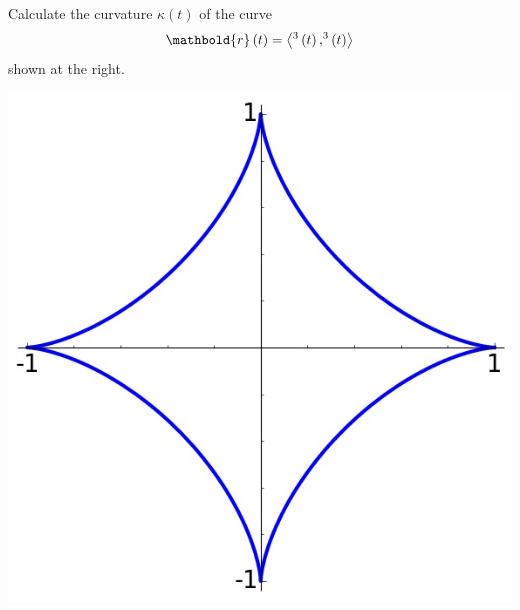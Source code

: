 \documentclass[answers,12pt,addpoints]{exam}
\let\cos\relax\DeclareMathOperator{\cos}{\mathsf{cos}}
\let\sin\relax\DeclareMathOperator{\sin}{\mathsf{sin}}
\begin{document}
\begin{questions}
\ifprintanswers\else\begin{multicols}{2}\fi
\question[25] Calculate the curvature
$\kappa\left(t\right)$ of the curve
\[\mathbold{r}\left(t\right)
=\left\langle\cos^3\left(t\right),\sin^3\left(t\right)
\right\rangle\]
\ifprintanswers\else
shown at the right.
\begin{center}\includegraphics[scale=.4]{Astroid}\end{center}
\end{multicols}\fi

\end{questions}
\end{document}
